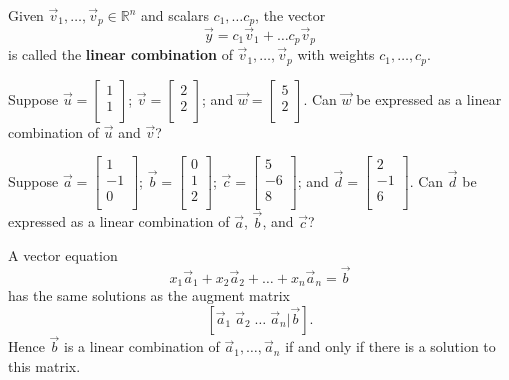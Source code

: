 \documentclass[12pt,letterpaper]{article}
\begin{document}
\begin{enumerate}
\begin{defn} Given $\vec{v}_1,\dots, \vec{v}_p \in \mathbb{R}^n$ and scalars $c_1, \dots c_p$, the vector $$\vec{y} = c_1 \vec{v}_1 +\dots c_p \vec{v}_p$$ is called the {\bf linear combination} of $\vec{v}_1,\dots, \vec{v}_p$ with weights $c_1,\dots,c_p$.
\end{defn}

\Problem Suppose $\vec{u} =\begin{bmatrix} 1\\1\\ \end{bmatrix}$;  $\vec{v} =\begin{bmatrix} 2\\2\\ \end{bmatrix}$; and  $\vec{w} =\begin{bmatrix} 5\\2\\ \end{bmatrix}$. Can $\vec{w}$ be expressed as a linear combination of $\vec{u}$ and $\vec{v}$?


\newpage

\Problem Suppose $\vec{a} =\begin{bmatrix} 1\\-1\\ 0\\ \end{bmatrix}$; $\vec{b} =\begin{bmatrix} 0\\1\\ 2\\ \end{bmatrix}$; $\vec{c} =\begin{bmatrix} 5\\-6\\8\\ \end{bmatrix}$; and  $\vec{d} =\begin{bmatrix} 2\\-1\\6\\ \end{bmatrix}$. Can $\vec{d}$ be expressed as a linear combination of $\vec{a}$, $\vec{b}$, and $\vec{c}$?


\newpage

A vector equation $$x_1 \vec{a}_1 + x_2 \vec{a}_2 +\dots + x_n \vec{a}_n =\vec{b}$$ has the same solutions as the augment matrix $$[\vec{a}_1 \; \vec{a}_2 \; \dots \; \vec{a}_n \Big| \vec{b}].$$ Hence $\vec{b}$ is a linear combination of $\vec{a}_1, \dots, \vec{a}_n$ if and only if there is a solution to this matrix.


\end{enumerate}
\end{document}
